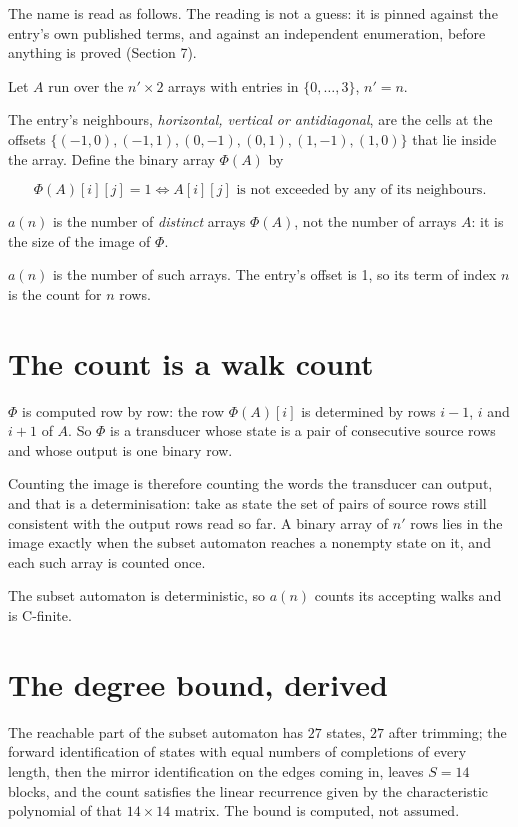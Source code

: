 \documentclass[11pt]{article}
\theoremstyle{definition}
\begin{document}
The name is read as follows. The reading is not a guess: it is pinned against the entry's own published terms, and against an independent enumeration, before anything is proved (Section 7).

Let $A$ run over the $n' \times 2$ arrays with entries in $\{0,\dots,3\}$, $n' = n$.

The entry's neighbours, {\itshape horizontal, vertical or antidiagonal}, are the cells at the offsets $\{(-1,0), (-1,1), (0,-1), (0,1), (1,-1), (1,0)\}$ that lie inside the array. Define the binary array $\Phi(A)$ by

\[\Phi(A)[i][j] = 1 \iff A[i][j] \text{ is not exceeded by any of its neighbours}.\]

$a(n)$ is the number of {\itshape distinct} arrays $\Phi(A)$, not the number of arrays $A$: it is the size of the image of $\Phi$.

$a(n)$ is the number of such arrays. The entry's offset is 1, so its term of index $n$ is the count for $n$ rows.

\section{The count is a walk count}

$\Phi$ is computed row by row: the row $\Phi(A)[i]$ is determined by rows $i-1$, $i$ and $i+1$ of $A$. So $\Phi$ is a transducer whose state is a pair of consecutive source rows and whose output is one binary row.

Counting the image is therefore counting the words the transducer can output, and that is a determinisation: take as state the set of pairs of source rows still consistent with the output rows read so far. A binary array of $n'$ rows lies in the image exactly when the subset automaton reaches a nonempty state on it, and each such array is counted once.

The subset automaton is deterministic, so $a(n)$ counts its accepting walks and is C-finite.

\section{The degree bound, derived}

The reachable part of the subset automaton has $27$ states, $27$ after trimming; the forward identification of states with equal numbers of completions of every length, then the mirror identification on the edges coming in, leaves $S = 14$ blocks, and the count satisfies the linear recurrence given by the characteristic polynomial of that $14\times14$ matrix. The bound is computed, not assumed.
\end{document}
